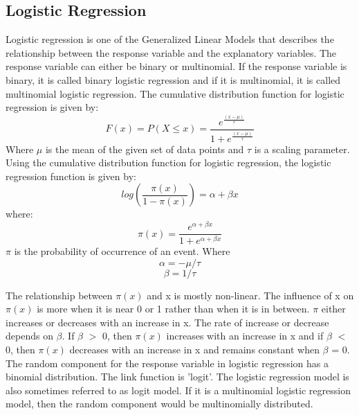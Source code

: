 \documentclass[sigconf]{acmart}
\begin{document}
\subsection{Logistic Regression}
Logistic regression is one of the Generalized Linear Models that describes the relationship between the response variable and the explanatory variables\cite{Agresti2007}. The response variable can either be binary or multinomial. If the response variable is binary, it is called binary logistic regression and if it is multinomial, it is called multinomial logistic regression. 
The  cumulative distribution function for logistic regression is given by:
\begin{equation}
    F(x) = P(X \leq x) = \frac{e^{\frac{(x-\mu)}{\tau}}}{1+e^{\frac{(x-\mu)}{\tau}}}
\end{equation}
Where $\mu$ is the mean of the given set of data points and $\tau$ is a scaling parameter.\\
Using the cumulative distribution function for logistic regression\cite{Agresti2007}, the logistic regression function is given by:
\begin{equation}
    log(\frac{\pi(x)}{1-\pi(x)}) = \alpha + \beta x
\end{equation}
where:
\begin{equation}
    \pi(x) = \frac{e^{\alpha+\beta x }}{1+e^{\alpha+\beta x }}
\end{equation}
$\pi$ is the probability of occurrence of an event. Where\\
\begin{equation}
    \alpha = -\mu/\tau
\end{equation}
\begin{equation}
    \beta = 1/\tau
\end{equation}

    

The relationship between $\pi(x)$ and x is mostly non-linear. The influence of x on $\pi(x)$ is more when it is near 0 or 1 rather than when it is in between. $\pi$ either increases or decreases with an increase in x\cite{Agresti2007}. The rate of increase or decrease depends on $\beta$. If $\beta$ $>$ 0, then $\pi(x)$ increases with an increase in x and if $\beta$ $<$ 0, then $\pi(x)$ decreases with an increase in x and remains constant when $\beta$ = 0.\\
The random component for the response variable in logistic regression has a binomial distribution. The link function is 'logit'. The logistic regression model is also sometimes referred to as logit model. If it is a multinomial logistic regression model, then the random component would be multinomially distributed\cite{Agresti2007}.
\end{document}
